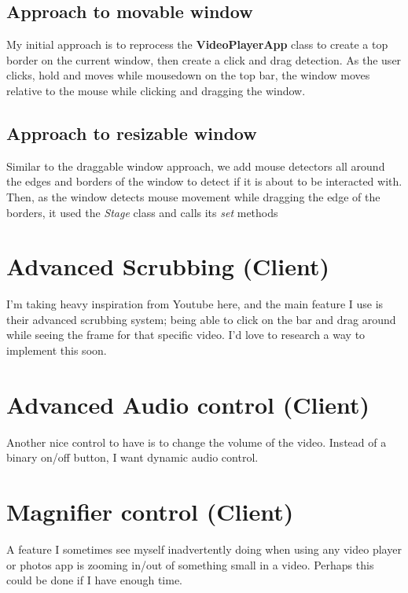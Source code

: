\documentclass{article}
\begin{document}
\subsection*{Approach to movable window}
My initial approach is to reprocess the \textbf{VideoPlayerApp} class to create a top border on the current window, then create a click and drag detection. As the user clicks, hold and moves while mousedown on the top bar, the window moves relative to the mouse while clicking and dragging the window.

\subsection*{Approach to resizable window}
Similar to the draggable window approach, we add mouse detectors all around the edges and borders of the window to detect if it is about to be interacted with. Then, as the window detects mouse movement while dragging the edge of the borders, it used the \textit{Stage} class and calls its \textit{set} methods

\section*{Advanced Scrubbing (Client)}
I'm taking heavy inspiration from Youtube here, and the main feature I use is their advanced scrubbing system; being able to click on the bar and drag around while seeing the frame for that specific video. I'd love to research a way to implement this soon.

\section*{Advanced Audio control (Client)}
Another nice control to have is to change the volume of the video. Instead of a binary on/off button, I want dynamic audio control.

\section*{Magnifier control (Client)}
A feature I sometimes see myself inadvertently doing when using any video player or photos app is zooming in/out of something small in a video. Perhaps this could be done if I have enough time.

\end{document}
